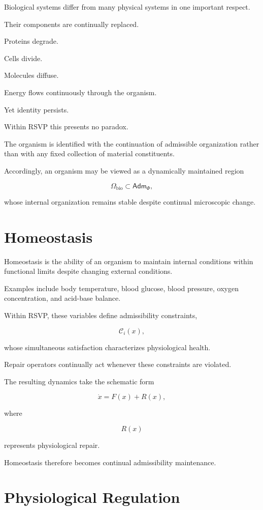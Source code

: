 \documentclass[11pt,oneside]{book}
\numberwithin{equation}{chapter}
\theoremstyle{definition}
\theoremstyle{plain}
\newcommand{\Adm}{\mathsf{Adm}}
\begin{document}
Biological systems differ from many physical systems in one important
respect.

Their components are continually replaced.

Proteins degrade.

Cells divide.

Molecules diffuse.

Energy flows continuously through the organism.

Yet identity persists.

Within RSVP this presents no paradox.

The organism is identified with the continuation of admissible organization
rather than with any fixed collection of material constituents.

Accordingly, an organism may be viewed as a dynamically maintained region

\[
\Omega_{\mathrm{bio}}
\subset
\Adm_\Phi,
\]

whose internal organization remains stable despite continual microscopic
change.

\section{Homeostasis}

Homeostasis is the ability of an organism to maintain internal conditions
within functional limits despite changing external conditions.

Examples include body temperature, blood glucose, blood pressure, oxygen
concentration, and acid-base balance.

Within RSVP, these variables define admissibility constraints,

\[
\mathcal C_i(x),
\]

whose simultaneous satisfaction characterizes physiological health.

Repair operators continually act whenever these constraints are violated.

The resulting dynamics take the schematic form

\[
\dot x
=
F(x)
+
R(x),
\]

where

\[
R(x)
\]

represents physiological repair.

Homeostasis therefore becomes continual admissibility maintenance.

\section{Physiological Regulation}
\end{document}
